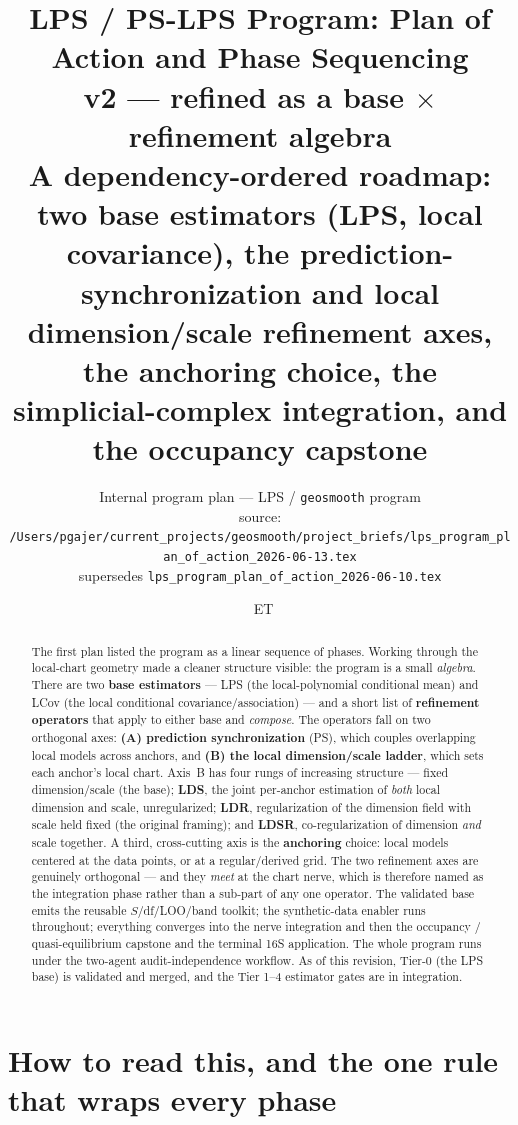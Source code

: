 \documentclass[11pt]{article}
\title{\textbf{LPS / PS-LPS Program: Plan of Action and Phase Sequencing}\\[3pt]
\large \textnormal{v2 --- refined as a base $\times$ refinement algebra}\\[4pt]
\normalsize A dependency-ordered roadmap: two base estimators (LPS, local
covariance), the prediction-synchronization and local dimension/scale refinement
axes, the anchoring choice, the simplicial-complex integration, and the occupancy
capstone}
\author{\small Internal program plan --- LPS / \texttt{geosmooth} program\\[2pt]
\footnotesize source: \nolinkurl{/Users/pgajer/current_projects/geosmooth/project_briefs/lps_program_plan_of_action_2026-06-13.tex}\\[1pt]
\footnotesize supersedes \nolinkurl{lps_program_plan_of_action_2026-06-10.tex}}
\date{\DTMnow\ \textnormal{\footnotesize ET}}
\begin{document}
\maketitle

\begin{abstract}\noindent
The first plan listed the program as a linear sequence of phases. Working through
the local-chart geometry made a cleaner structure visible: the program is a small
\emph{algebra}. There are two \textbf{base estimators} --- LPS (the local-polynomial
conditional mean) and LCov (the local conditional covariance/association) --- and a
short list of \textbf{refinement operators} that apply to either base and
\emph{compose}. The operators fall on two orthogonal axes: \textbf{(A) prediction
synchronization} (PS), which couples overlapping local models across anchors, and
\textbf{(B) the local dimension/scale ladder}, which sets each anchor's local chart.
Axis~B has four rungs of increasing structure --- fixed dimension/scale (the base);
\textbf{LDS}, the joint per-anchor estimation of \emph{both} local dimension and
scale, unregularized; \textbf{LDR}, regularization of the dimension field with scale
held fixed (the original framing); and \textbf{LDSR}, co-regularization of dimension
\emph{and} scale together. A third, cross-cutting axis is the \textbf{anchoring}
choice: local models centered at the data points, or at a regular/derived grid. The
two refinement axes are genuinely orthogonal --- and they \emph{meet} at the chart
nerve, which is therefore named as the integration phase rather than a sub-part of
any one operator. The validated base emits the reusable $S$/df/LOO/band toolkit; the
synthetic-data enabler runs throughout; everything converges into the nerve
integration and then the occupancy / quasi-equilibrium capstone and the terminal
16S application. The whole program runs under the two-agent audit-independence
workflow. As of this revision, Tier-0 (the LPS base) is validated and merged, and the
Tier 1--4 estimator gates are in integration.
\end{abstract}

{\small\tableofcontents}

\section{How to read this, and the one rule that wraps every phase}\label{sec:read}
\end{document}
